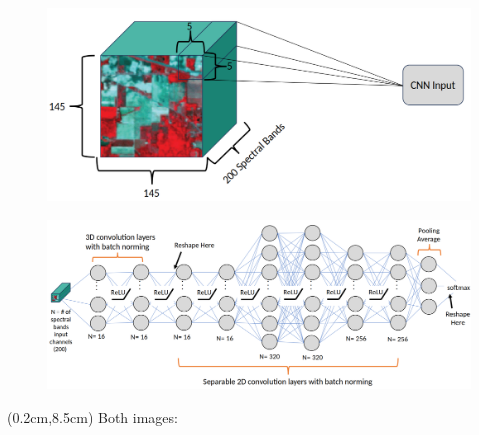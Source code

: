 \documentclass[aspectratio=169,xcolor=dvipsnames]{beamer}
\begin{document}
\begin{frame}
    \begin{figure}
        \includegraphics[width=0.5\linewidth]{cnn_data.png}
    \end{figure}

    \begin{figure}
        \includegraphics[width=0.8\linewidth]{cnn_arch.png}
    \end{figure}

    \begin{textblock*}{5cm}(0.2cm,8.5cm)
        \tiny Both images: \cite{dirk-presentation}
    \end{textblock*}

\end{frame}
\end{document}
